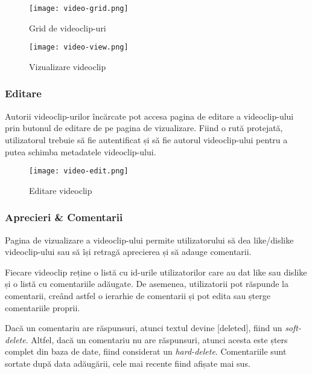 \begin{figure}[h] 
    \centering
    \begin{minipage}{0.49\textwidth}
        \centering
        \texttt{[image: video-grid.png]}
        \caption{Grid de videoclip-uri}
        \label{fig:video-grid}
    \end{minipage}\hfill
    \begin{minipage}{0.49\textwidth}
        \centering
        \texttt{[image: video-view.png]}
        \caption{Vizualizare videoclip}
        \label{fig:video-view}
    \end{minipage}
\end{figure}

\subsubsection{Editare}
Autorii videoclip-urilor încărcate pot accesa pagina de editare a videoclip-ului prin butonul
de editare de pe pagina de vizualizare. Fiind o rută protejată, utilizatorul trebuie să fie
autentificat și să fie autorul videoclip-ului pentru a putea schimba metadatele videoclip-ului.

\begin{figure}[h]
    \centering
    \texttt{[image: video-edit.png]}
    \caption{Editare videoclip}
    \label{fig:video-edit}
\end{figure}

\subsubsection{Aprecieri \& Comentarii}
Pagina de vizualizare a videoclip-ului permite utilizatorului să dea like/dislike videoclip-ului
sau să își retragă aprecierea și să adauge comentarii. 
\par
Fiecare videoclip reține o listă cu id-urile utilizatorilor care au dat like sau dislike și o
listă cu comentariile adăugate. De asemenea, utilizatorii pot răspunde la comentarii, creând astfel
o ierarhie de comentarii și pot edita sau șterge comentariile proprii.
\par
Dacă un comentariu are răspunsuri, atunci textul devine [deleted], fiind un \textit{soft-delete}.
Altfel, dacă un comentariu nu are răspunsuri, atunci acesta este șters complet din baza de date,
fiind considerat un \textit{hard-delete}. Comentariile sunt sortate după data adăugării, cele mai
recente fiind afișate mai sus. 

